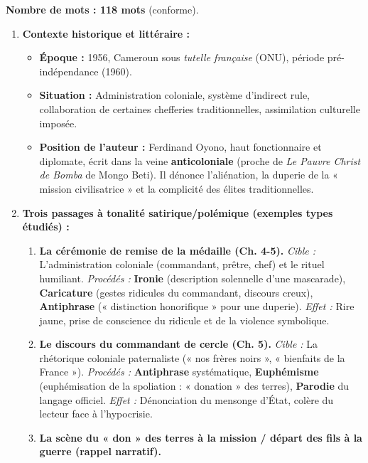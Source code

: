 \documentclass[11pt]{article}
\newcommand{\cle}[1]{{\popxbold\color{popdark}#1}}
\begin{document}
\begin{corrige}
\begin{enumerate}
\begin{quote}
\end{quote}
\textbf{Nombre de mots : 118 mots} (conforme).
\end{enumerate}
\end{corrige}

\begin{corrige}
\begin{enumerate}
\item \textbf{Contexte historique et littéraire :}
\begin{itemize}
\item \textbf{Époque :} 1956, Cameroun sous \emph{tutelle française} (ONU), période pré-indépendance (1960).
\item \textbf{Situation :} Administration coloniale, système d'indirect rule, collaboration de certaines chefferies traditionnelles, assimilation culturelle imposée.
\item \textbf{Position de l'auteur :} \cle{Ferdinand Oyono}, haut fonctionnaire et diplomate, écrit dans la veine \textbf{anticoloniale} (proche de \emph{Le Pauvre Christ de Bomba} de Mongo Beti). Il dénonce l'aliénation, la duperie de la « mission civilisatrice » et la complicité des élites traditionnelles.
\end{itemize}
\item \textbf{Trois passages à tonalité satirique/polémique (exemples types étudiés) :}
\begin{enumerate}
\item \textbf{La cérémonie de remise de la médaille (Ch. 4-5).}
\textit{Cible :} L'administration coloniale (commandant, prêtre, chef) et le rituel humiliant.
\textit{Procédés :} \textbf{Ironie} (description solennelle d'une mascarade), \textbf{Caricature} (gestes ridicules du commandant, discours creux), \textbf{Antiphrase} (« distinction honorifique » pour une duperie).
\textit{Effet :} Rire jaune, prise de conscience du ridicule et de la violence symbolique.
\item \textbf{Le discours du commandant de cercle (Ch. 5).}
\textit{Cible :} La rhétorique coloniale paternaliste (« nos frères noirs », « bienfaits de la France »).
\textit{Procédés :} \textbf{Antiphrase} systématique, \textbf{Euphémisme} (euphémisation de la spoliation : « donation » des terres), \textbf{Parodie} du langage officiel.
\textit{Effet :} Dénonciation du mensonge d'État, colère du lecteur face à l'hypocrisie.
\item \textbf{La scène du « don » des terres à la mission / départ des fils à la guerre (rappel narratif).}

\end{enumerate}
\end{enumerate}
\end{corrige}
\end{document}
